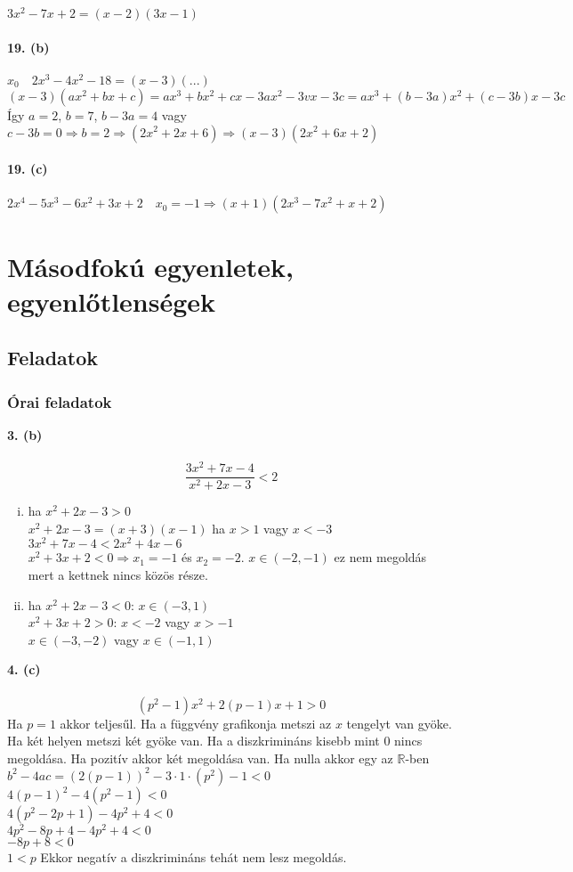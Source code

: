 \documentclass[12pt,a4paper,fleqn]{article}
\begin{document}
$ 3x^2-7x+2=(x-2)(3x-1) $ \\\\
\textbf{19. (b)} \\\\
$ x_0 \quad 2x^3-4x^2-18 = (x-3)(...)$ \\
$ (x-3)(ax^2+bx+c) = ax^3+bx^2+cx-3ax^2-3vx-3c = ax^3+(b-3a)x^2+(c-3b)x-3c $ \\
Így $a=2$, $b=7$, $b-3a=4$ vagy $c-3b=0 \Rightarrow b=2 \Longrightarrow (2x^2+2x+6) \Rightarrow (x-3)(2x^2+6x+2)$ \\\\
\textbf{19. (c)} \\\\
$2x^4-5x^3-6x^2+3x+2 \quad x_0=-1 \Longrightarrow (x+1)(2x^3-7x^2+x+2)$

\section{Másodfokú egyenletek, egyenlőtlenségek}
\setcounter{subsection}{1}
\subsection{Feladatok}
\subsubsection{Órai feladatok}
\textbf{3. (b)} \\\\
$$ \dfrac{3x^2+7x-4}{x^2+2x-3} < 2 $$
\begin{enumerate}[i.]
  \item ha $x^2+2x-3 > 0$ \\
  $x^2+2x-3 = (x+3)(x-1)$ ha $x>1$ vagy $x<-3$ \\
  $3x^2+7x-4 < 2x^2+4x-6$ \\
  $x^2 + 3x + 2 < 0 \Rightarrow x_1=-1$ és $x_2=-2$. $x \in (-2, -1)$ ez nem megoldás mert a kettnek nincs közös része.
  \item ha $x^2+2x-3 < 0$: $x \in (-3, 1)$ \\
  $x^2+3x+2 > 0$: $x<-2$ vagy $x>-1$ \\
  $x \in (-3, -2)$ vagy $x \in (-1, 1)$
\end{enumerate}
\textbf{4. (c)} \\\\
$$ (p^2-1)x^2 + 2(p-1)x + 1 > 0 $$
Ha $p=1$ akkor teljesűl.
Ha a függvény grafikonja metszi az $x$ tengelyt van gyöke. Ha két helyen metszi két gyöke van.
Ha a diszkrimináns kisebb mint 0 nincs megoldása. Ha pozitív akkor két megoldása van. Ha nulla akkor egy az $\mathbb{R}$-ben \\
$b^2-4ac=(2(p-1))^2-3 \cdot 1 \cdot (p^2)-1 < 0$ \\
$ 4(p-1)^2 - 4(p^2 - 1) < 0 $ \\
$ 4(p^2 - 2p + 1) - 4p^2 + 4 < 0 $ \\
$ 4p^2 - 8p + 4 - 4p^2 + 4 < 0 $ \\
$ -8p + 8 < 0 $ \\
$ 1 < p $ Ekkor negatív a diszkrimináns tehát nem lesz megoldás.
\end{document}
